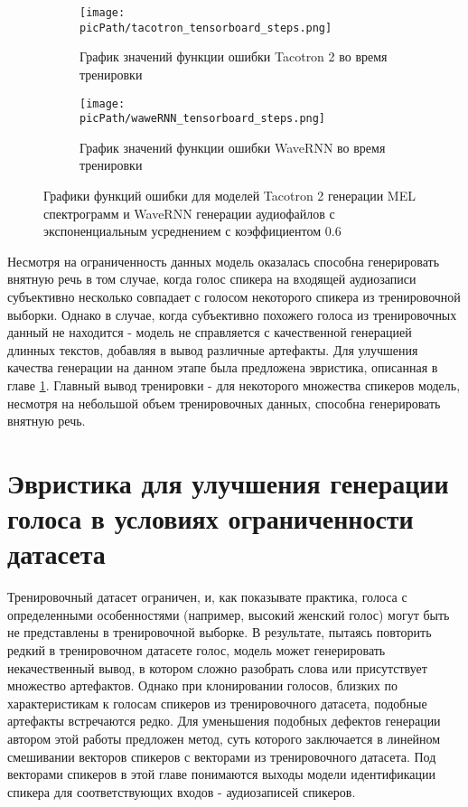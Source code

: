 \documentclass[oneside,final,14pt]{extreport}
\newcommand{\picPath}{pictures}
\begin{document}
\begin{figure}[H]
  \centering
  \begin{subfigure}[b]{1.0\linewidth}
    \texttt{[image: \\picPath/tacotron\_tensorboard\_steps.png]}
    \caption{График значений функции ошибки Tacotron 2 во время тренировки}
    \label{pic:training_graph_tacotron}
  \end{subfigure}
   \begin{subfigure}[b]{1.0\linewidth}
    \texttt{[image: \\picPath/waweRNN\_tensorboard\_steps.png]}
    \caption{График значений функции ошибки WaveRNN во время тренировки}
 \label{pic:training_graph_wavernn}
  \end{subfigure}
  \caption{Графики функций ошибки для моделей Tacotron 2 генерации MEL спектрограмм и WaveRNN генерации аудиофайлов с экспоненциальным усреднением с коэффициентом 0.6}
  \label{pic:training_graphs}
\end{figure}


Несмотря на ограниченность данных модель оказалась способна генерировать внятную речь в том случае, когда голос спикера на входящей аудиозаписи субъективно несколько совпадает с голосом некоторого спикера из тренировочной выборки. Однако в случае, когда субъективно похожего голоса из тренировочных данный не находится - модель не справляется с качественной генерацией длинных текстов, добавляя в вывод различные артефакты. Для улучшения качества генерации на данном этапе была предложена эвристика, описанная в главе \ref{chap:heuristic}. Главный вывод тренировки - для некоторого множества спикеров модель, несмотря на небольшой объем тренировочных данных, способна генерировать внятную речь.


\iffalse
В попытке улучшить качество генерации в качестве модели, решающей задачу идентификацию спикера, вместо имеющегося LSTM была использована Resnet подобная архитектура. Чекпуинта не нашлось, к сожалению, для resnet, поэтому затею бросил
\fi
\section{Эвристика для улучшения генерации голоса в условиях ограниченности датасета}
\label{chap:heuristic}
Тренировочный датасет ограничен, и, как показывате практика, голоса с определенными особенностями (например, высокий женский голос) могут быть не представлены в тренировочной выборке. В результате, пытаясь повторить редкий в тренировочном датасете голос, модель может генерировать некачественный вывод, в котором сложно разобрать слова или присутствует множество артефактов. Однако при клонировании голосов, близких по характеристикам к голосам спикеров из тренировочного датасета, подобные артефакты встречаются редко.  Для уменьшения подобных дефектов генерации автором этой работы предложен метод, суть которого заключается в линейном смешивании векторов спикеров с векторами из тренировочного датасета. Под векторами спикеров в этой главе понимаются выходы модели идентификации спикера для соответствующих входов - аудиозаписей спикеров.  
\end{document}

